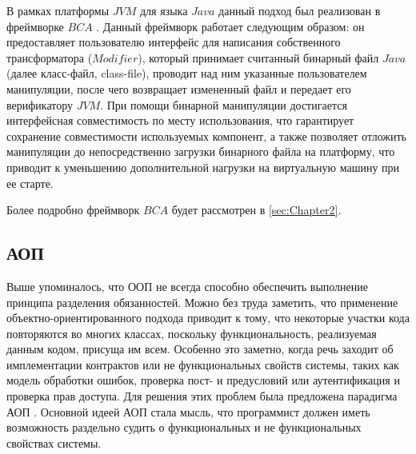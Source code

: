 В рамках платформы $JVM$ для языка $Java$ данный подход был реализован в фреймворке $BCA$ \cite{bca}. Данный фреймворк работает следующим образом: он предоставляет пользователю интерфейс для написания собственного трансформатора ($Modifier$), который принимает считанный бинарный файл $Java$ (далее класс-файл, class-file), проводит над ним указанные пользователем манипуляции, после чего возвращает измененный файл и передает его верификатору $JVM$. При помощи бинарной манипуляции достигается интерфейсная совместимость по месту использования, что гарантирует сохранение совместимости используемых компонент, а также позволяет отложить манипуляции до непосредственно загрузки бинарного файла на платформу, что приводит к уменьшению дополнительной нагрузки на виртуальную машину при ее старте.

Более подробно фреймворк $BCA$ будет рассмотрен в \autoref{sec:Chapter2}.

\subsection{АОП}

Выше упоминалось, что ООП не всегда способно обеспечить выполнение принципа разделения обязанностей. Можно без труда заметить, что применение объектно-ориентированного подхода приводит к тому, что некоторые участки кода повторяются во многих классах, поскольку функциональность, реализуемая данным кодом, присуща им всем. Особенно это заметно, когда речь заходит об имплементации контрактов или не функциональных свойств системы, таких как модель обработки ошибок, проверка пост- и предусловий или аутентификация и проверка прав доступа. Для решения этих проблем была предложена парадигма АОП \cite{kiczales1997}. Основной идеей АОП стала мысль, что программист должен иметь возможность раздельно судить о функциональных и не функциональных свойствах системы.


